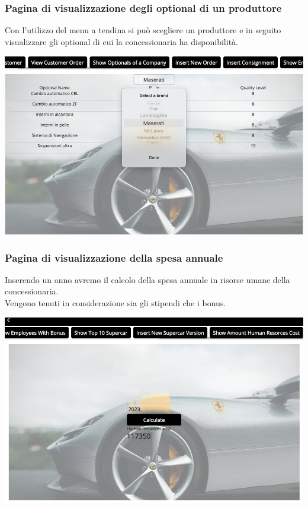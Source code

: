 \documentclass[11pt]{article}
\begin{document}
\subsubsection{Pagina di visualizzazione degli optional di un produttore}
Con l'utilizzo del menu a tendina si può scegliere un produttore e in seguito
visualizzare gli optional di cui la concessionaria ha disponibilità.

\begin{center}
    \includegraphics[width=\linewidth]{images/app/brandOptional.png}
\end{center}

\subsubsection{Pagina di visualizzazione della spesa annuale}
Inserendo un anno avremo il calcolo della spesa annuale in risorse umane della
concessionaria. \\
Vengono tenuti in considerazione sia gli stipendi che i bonus.

\begin{center}
    \includegraphics[width=\linewidth]{images/app/humanResourcesCost.png}
\end{center}
\end{document}

